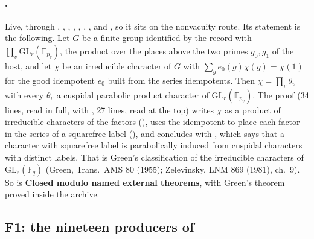 \documentclass[11pt]{article}
\newcommand{\sE}{\textbf{Closed modulo named external theorems}}
\theoremstyle{remark}
\begin{document}
\paragraph{.} Live, through , , , , , , ,  and , so it sits on the nonvacuity route. Its statement is the following. Let $G$ be a finite group identified by the record with $\prod_v\mathrm{GL}_r(\mathbb F_{p_v})$, the product over the places above the two primes $g_0,g_1$ of the host, and let $\chi$ be an irreducible character of $G$ with $\sum_g e_0(g)\chi(g)=\chi(1)$ for the good idempotent $e_0$ built from the series idempotents. Then $\chi=\prod_v\theta_v$ with every $\theta_v$ a cuspidal parabolic product character of $\mathrm{GL}_r(\mathbb F_{p_v})$. The proof (34 lines, read in full, with , 27 lines, read at the top) writes $\chi$ as a product of irreducible characters of the factors (), uses the idempotent to place each factor in the series of a squarefree label (), and concludes with , which says that a character with squarefree label is parabolically induced from cuspidal characters with distinct labels. That is Green's classification of the irreducible characters of $\mathrm{GL}_r(\mathbb F_q)$ (Green, Trans.\ AMS 80 (1955); Zelevinsky, LNM 869 (1981), ch.~9). So  is \sE, with Green's theorem proved inside the archive.

\subsection{F1: the nineteen producers of }\label{sec:fu2f1}
\end{document}
